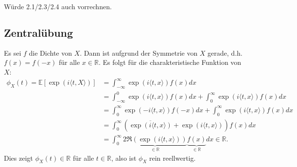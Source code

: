 \documentclass[a4paper]{article}
\begin{document}
\makeexheaderger

Würde 2.1/2.3/2.4 auch vorrechnen.

\subsection{Zentralübung}

Es sei $f$ die Dichte von $X$. Dann ist aufgrund der Symmetrie von $X$ gerade, d.h. $f(x) = f(-x)$ für alle $x \in \mathds{R}$. Es folgt für die charakteristische Funktion von $X$:
\begin{align*}
	\phi_X(t) = \mathds{E}[\exp(i \langle t, X \rangle)] & = \int_{-\infty}^{\infty} \exp(i\langle t, x \rangle) f(x) dx                                                                                     \\
	                                                     & = \int_{-\infty}^{0} \exp(i\langle t, x \rangle) f(x) dx + \int_{0}^{\infty} \exp(i\langle t, x \rangle) f(x) dx                                  \\
	                                                     & = \int_{0}^{\infty} \exp(-i\langle t, x \rangle) f(-x) dx + \int_{0}^{\infty} \exp(i\langle t, x \rangle) f(x) dx                                 \\
	                                                     & = \int_{0}^{\infty} (\overline{\exp(i\langle t, x \rangle)} + \exp(i\langle t, x \rangle)) f(x) dx
	\\
	                                                     & = \int_{0}^{\infty} \underbrace{2 \Re(\exp(i\langle t, x \rangle))}_{\in \mathds{R}} \underbrace{f(x)}_{\in \mathds{R}} dx \in \mathds{R}\text{.}
\end{align*}
Dies zeigt $\phi_X(t) \in \mathds{R}$ für alle $t \in \mathds{R}$, also ist $\phi_X$ rein reellwertig.

\addtocounter{subsection}{1}

\subsection{}
\end{document}

